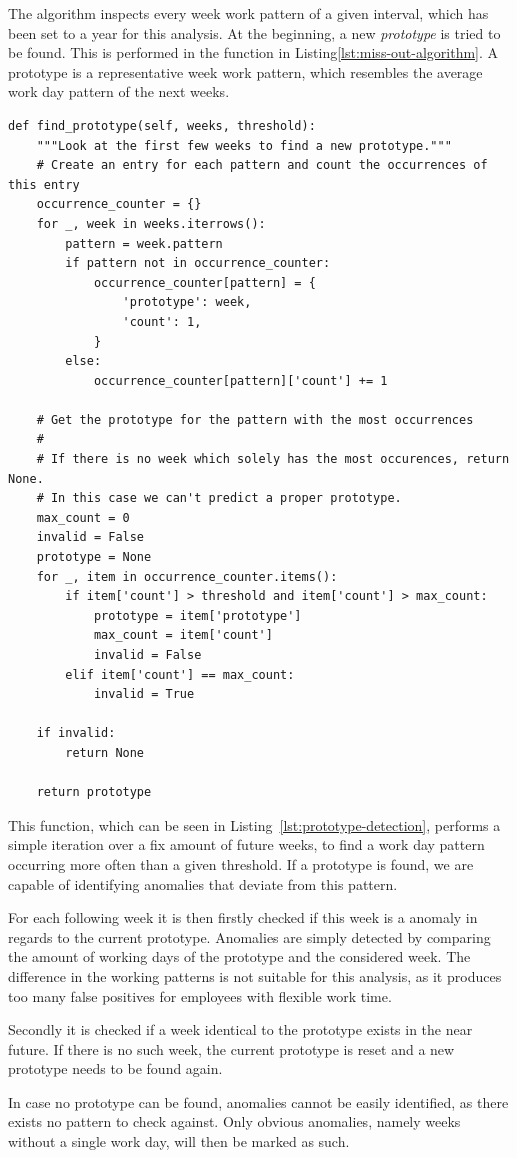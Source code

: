 The algorithm inspects every week work pattern of a given interval, which has been set to a year for this analysis.
At the beginning, a new \emph{prototype} is tried to be found.
This is performed in the function  in Listing\ref{lst:miss-out-algorithm}.
A prototype is a representative week work pattern, which resembles the average work day pattern of the next weeks.


\begin{verbatim}
def find_prototype(self, weeks, threshold):
    """Look at the first few weeks to find a new prototype."""
    # Create an entry for each pattern and count the occurrences of this entry
    occurrence_counter = {}
    for _, week in weeks.iterrows():
        pattern = week.pattern
        if pattern not in occurrence_counter:
            occurrence_counter[pattern] = {
                'prototype': week,
                'count': 1,
            }
        else:
            occurrence_counter[pattern]['count'] += 1

    # Get the prototype for the pattern with the most occurrences
    #
    # If there is no week which solely has the most occurences, return None.
    # In this case we can't predict a proper prototype.
    max_count = 0
    invalid = False
    prototype = None
    for _, item in occurrence_counter.items():
        if item['count'] > threshold and item['count'] > max_count:
            prototype = item['prototype']
            max_count = item['count']
            invalid = False
        elif item['count'] == max_count:
            invalid = True

    if invalid:
        return None

    return prototype
\end{verbatim}
\begingroup
{}\label{lst:prototype-detection}
\endgroup

This function, which can be seen in Listing~\ref{lst:prototype-detection}, performs a simple iteration over a fix amount of future weeks, to find a work day pattern occurring more often than a given threshold.
If a prototype is found, we are capable of identifying anomalies that deviate from this pattern.

For each following week it is then firstly checked if this week is a anomaly in regards to the current prototype.
Anomalies are simply detected by comparing the amount of working days of the prototype and the considered week.
The difference in the working patterns is not suitable for this analysis, as it produces too many false positives for employees with flexible work time.

Secondly it is checked if a week identical to the prototype exists in the near future.
If there is no such week, the current prototype is reset and a new prototype needs to be found again.

In case no prototype can be found, anomalies cannot be easily identified, as there exists no pattern to check against.
Only obvious anomalies, namely weeks without a single work day, will then be marked as such.
